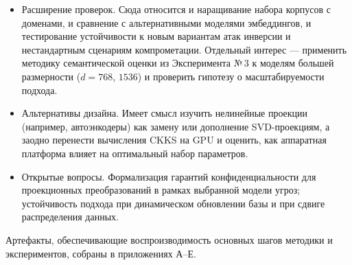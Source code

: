 \documentclass[a4paper, 12pt, oneside, openany]{article}
\begin{document}
\begin{itemize}
	\item
	Расширение проверок. Сюда относится и наращивание набора корпусов с доменами, и сравнение с альтернативными моделями эмбеддингов, и тестирование устойчивости к новым вариантам атак инверсии и нестандартным сценариям компрометации. Отдельный интерес — применить методику семантической оценки из Эксперимента №\,3 к моделям большей размерности ($d = 768$, $1536$) и проверить гипотезу о масштабируемости подхода.
	\item
	Альтернативы дизайна. Имеет смысл изучить нелинейные проекции (например, автоэнкодеры) как замену или дополнение SVD-проекциям, а заодно перенести вычисления CKKS на GPU и оценить, как аппаратная платформа влияет на оптимальный набор параметров.
	\item
	Открытые вопросы. Формализация гарантий конфиденциальности для проекционных преобразований в рамках выбранной модели угроз; устойчивость подхода при динамическом обновлении базы и при сдвиге распределения данных.
\end{itemize}

Артефакты, обеспечивающие воспроизводимость основных шагов методики и экспериментов, собраны в приложениях А--Е.






\newpage


\end{document}
